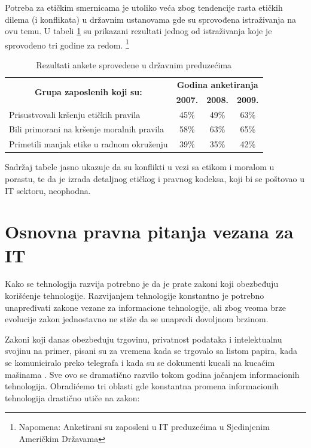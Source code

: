 \documentclass[a4paper]{article}
\begin{document}
{%
Potreba za etičkim smernicama je utoliko veća zbog tendencije rasta etičkih dilema (i konflikata) u državnim ustanovama gde su sprovođena istraživanja na ovu temu.
U tabeli \ref{tabela} su prikazani rezultati jednog od istraživanja koje je sprovođeno tri godine za redom.
\footnote{Napomena: Anketirani su zaposleni u IT preduzećima u Sjedinjenim Američkim Dr\-ža\-va\-ma}
\vspace{0.5cm}
\begin{table}[h!]
\begin{adjustbox}{width=\textwidth}
\begin{tabular}{|l|l|c|c|c|}
\hline
\multicolumn{2}{|c|}{\multirow{2}{*}{\textbf{Grupa zaposlenih koji su:}}}         & \multicolumn{3}{c|}{\textbf{Godina anketiranja}} \\ \cline{3-5} 
\multicolumn{2}{|c|}{}  & \textbf{2007.}    & \textbf{2008.}   & \textbf{2009.}   \\ \hline
\multicolumn{2}{|l|}{\small{Prisustvovali kršenju etičkih pravila}}      & 45\%  & 49\% & 63\%  \\ \hline
\multicolumn{2}{|l|}{\small{Bili primorani na kršenje moralnih pravila}} & 58\%  & 63\% & 65\%  \\ \hline
\multicolumn{2}{|l|}{\small{Primetili manjak etike u radnom okruženju}}  & 39\%  & 35\% & 42\%  \\ \hline
\end{tabular} 
\end{adjustbox} 
\caption{Rezultati ankete sprovedene u državnim preduzećima}
\label{tabela}
\end{table} 

Sadržaj tabele jasno ukazuje da su konflikti u vezi sa etikom i moralom u porastu, te da je izrada detaljnog etičkog i pravnog kodeksa, koji bi se poštovao u IT sektoru, neophodna.

\section{Osnovna pravna pitanja vezana za IT}

Kako se tehnologija razvija potrebno je da je prate zakoni koji obez\-be\-đu\-ju korišćenje tehnologije. Razvijanjem tehnologije konstantno je potrebno unapređivati zakone vezane za informacione tehnologije, ali zbog veoma brze evolucije zakon jednostavno ne stiže da se unapredi dovoljnom brzinom.

Zakoni koji danas obezbeđuju trgovinu, privatnost podataka i intelektualnu svojinu na primer, pisani su za vremena kada se trgovalo sa listom papira, kada se komuniciralo preko telegrafa i kada su se dokumenti kucali na kucaćim mašinama \cite{Legal_issues}. Sve ovo se dramatično razvilo tokom godina jačanjem informacionih tehnologija.
Obradićemo tri oblasti gde konstantna promena informacionih tehnologija drastično utiče na zakon:

}
\end{document}
